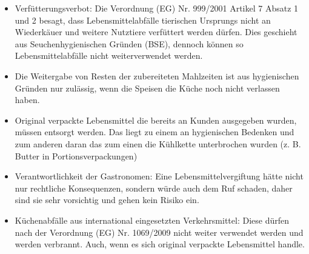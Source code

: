 \begin{itemize}
  \item Verfütterungsverbot: Die Verordnung (EG) Nr. 999/2001 Artikel 7 Absatz 1 und 2 besagt, dass Lebensmittelabfälle tierischen Ursprungs nicht an Wiederkäuer und weitere Nutztiere verfüttert werden dürfen.
  Dies geschieht aus Seuchenhygienischen Gründen (BSE), dennoch können so Lebensmittelabfälle nicht weiterverwendet werden. %
  
  \item Die Weitergabe von Resten der zubereiteten Mahlzeiten ist aus hygienischen Gründen nur zulässig, wenn die Speisen die Küche noch nicht verlassen haben. %
  \item Original verpackte Lebensmittel die bereits an Kunden ausgegeben wurden, müssen entsorgt werden. Das liegt zu einem an hygienischen Bedenken und zum anderen daran das zum einen die Kühlkette unterbrochen wurden (z. B. Butter in Portionsverpackungen) %
  \item Verantwortlichkeit der Gastronomen: Eine Lebensmittelvergiftung hätte nicht nur rechtliche Konsequenzen, sondern würde auch dem Ruf schaden, daher sind sie sehr vorsichtig und gehen kein Risiko ein.  %
  \item Küchenabfälle aus international eingesetzten Verkehrsmittel: Diese dürfen nach der Verordnung (EG) Nr. 1069/2009 nicht weiter verwendet werden und werden verbrannt. Auch, wenn es sich original verpackte Lebensmittel handle.
\end{itemize}

